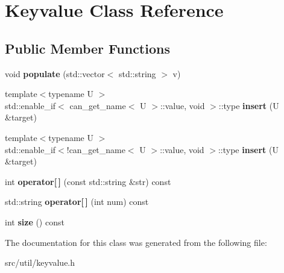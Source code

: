 \hypertarget{class_keyvalue}{}\section{Keyvalue Class Reference}
\label{class_keyvalue}
\subsection*{Public Member Functions}
\begin{DoxyCompactItemize}
\item 
\mbox{\label{class_keyvalue_a292a85f63c2de771c8fa7d3b8a82e1be}} 
void {\bfseries populate} (std\+::vector$<$ std\+::string $>$ v)
\item 
\mbox{\label{class_keyvalue_acaa4c8e2005fb9757e8cb584433401e5}} 
{\footnotesize template$<$typename U $>$ }\\std\+::enable\+\_\+if$<$ can\+\_\+get\+\_\+name$<$ U $>$\+::value, void $>$\+::type {\bfseries insert} (U \&target)
\item 
\mbox{\label{class_keyvalue_a61c4aedfeb8b34525b954f893690e514}} 
{\footnotesize template$<$typename U $>$ }\\std\+::enable\+\_\+if$<$!can\+\_\+get\+\_\+name$<$ U $>$\+::value, void $>$\+::type {\bfseries insert} (U \&target)
\item 
\mbox{\label{class_keyvalue_a6e50ffd83f7f1e5808072ab59d71147a}} 
int {\bfseries operator\mbox{[}$\,$\mbox{]}} (const std\+::string \&str) const
\item 
\mbox{\label{class_keyvalue_a02404a9180538efc9135180f28884336}} 
std\+::string {\bfseries operator\mbox{[}$\,$\mbox{]}} (int num) const
\item 
\mbox{\label{class_keyvalue_a940e6119f94f943e6485ea1b7065882f}} 
int {\bfseries size} () const
\end{DoxyCompactItemize}


The documentation for this class was generated from the following file\+:\begin{DoxyCompactItemize}
\item 
src/util/keyvalue.\+h\end{DoxyCompactItemize}
